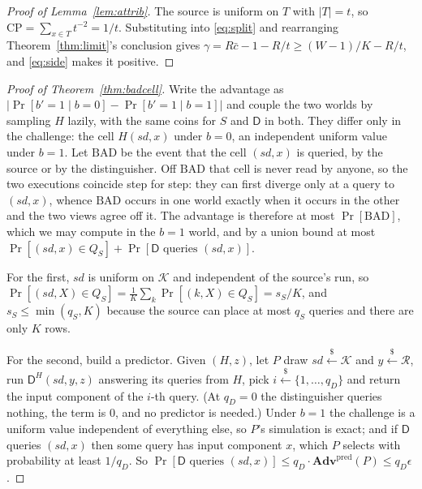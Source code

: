 \documentclass{aicr-solution}
\newcommand{\Adv}{\mathbf{Adv}}
\newcommand{\sd}{\mathit{sd}}
\renewcommand{\sample}{\stackrel{{\scriptscriptstyle\$}}{\leftarrow}}
\newcommand{\calK}{\mathcal{K}}
\newcommand{\calR}{\mathcal{R}}
\newcommand{\CP}{\mathrm{CP}}
\begin{document}
\begin{proof}[Proof of Lemma~\ref{lem:attrib}]
The source is uniform on $T$ with $|T| = t$, so $\CP = \sum_{x\in T} t^{-2} = 1/t$. Substituting
into \eqref{eq:split} and rearranging Theorem~\ref{thm:limit}'s conclusion gives
$\gamma = R\bar c - 1 - R/t \ge (W-1)/K - R/t$, and \eqref{eq:side} makes it positive.
\end{proof}
\begin{proof}[Proof of Theorem~\ref{thm:badcell}]
Write the advantage as $|\Pr[b' = 1 \mid b = 0] - \Pr[b' = 1 \mid b = 1]|$ and couple the two worlds
by sampling $H$ lazily, with the same coins for $S$ and $\mathsf{D}$ in both. They differ only in
the challenge: the cell $H(\sd,x)$ under $b = 0$, an independent uniform value under $b = 1$. Let
$\mathrm{BAD}$ be the event that the cell $(\sd,x)$ is queried, by the source or by the
distinguisher. Off $\mathrm{BAD}$ that cell is never read by anyone, so the two executions coincide
step for step: they can first diverge only at a query to $(\sd,x)$, whence $\mathrm{BAD}$ occurs in
one world exactly when it occurs in the other and the two views agree off it. The advantage is
therefore at most $\Pr[\mathrm{BAD}]$, which we may compute in the $b = 1$ world, and by a union
bound at most
$\Pr[(\sd,x) \in Q_S] + \Pr[\mathsf{D} \text{ queries } (\sd,x)]$.

For the first, $\sd$ is uniform on $\calK$ and independent of the source's run, so
$\Pr[(\sd,X) \in Q_S] = \frac1K\sum_k \Pr[(k,X) \in Q_S] = s_S/K$, and $s_S \le \min(q_S,K)$ because
the source can place at most $q_S$ queries and there are only $K$ rows.

For the second, build a predictor. Given $(H,z)$, let $P$ draw $\sd \sample \calK$ and
$y \sample \calR$, run $\mathsf{D}^{H}(\sd, y, z)$ answering its queries from $H$, pick
$i \sample \{1,\dots,q_D\}$ and return the input component of the $i$-th query. (At $q_D = 0$
the distinguisher queries nothing, the term is $0$, and no predictor is needed.) Under $b = 1$ the
challenge is a uniform value independent of everything else, so $P$'s simulation is exact; and if
$\mathsf{D}$ queries $(\sd,x)$ then some query has input component $x$, which $P$ selects with
probability at least $1/q_D$. So $\Pr[\mathsf{D}\text{ queries }(\sd,x)] \le q_D \cdot
\Adv^{\mathrm{pred}}(P) \le q_D\epsilon$.
\end{proof}
\end{document}
